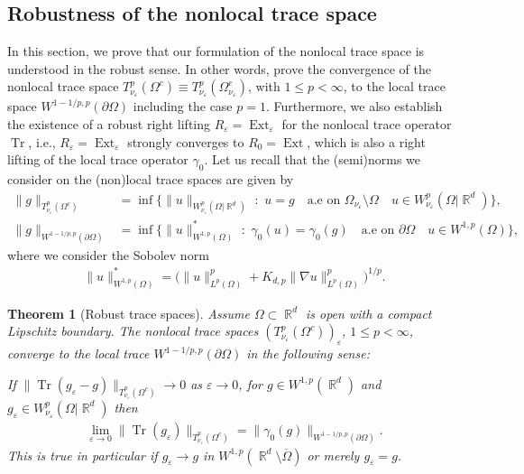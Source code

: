 \documentclass[12pt, reqno]{amsart}%
\theoremstyle{plain}  %
\newtheorem{theorem}{Theorem}[section]
\theoremstyle{definition}  %
\numberwithin{equation}{section}
\DeclareMathOperator{\R}{\mathbb{R}}
\newcommand{\eps}{\varepsilon}
\newcommand{\WnuOmRa}{W^p_{\nu_\eps}(\Omega|\R^d )}
\newcommand{\TnuOma}{T^p_{\nu_\eps} (\Omega^c)}
\begin{document}
\subsection{Robustness of the nonlocal trace space}
In this section, we prove that  our formulation of the nonlocal trace space is understood in the robust sense. In other words,  prove the convergence of the nonlocal trace space $\TnuOma\equiv T^p_{\nu_\eps}(\Omega^e_{\nu_\eps})$, with $1\leq p<\infty$, to the local  trace space  $W^{1-1/p ,p}(\partial \Omega) $ including the case $p=1$.
Furthermore, we also establish the existence of a robust right lifting  $R_\eps =\operatorname{Ext}_\eps$ for the nonlocal trace operator $\operatorname{Tr}$, i.e.,   $R_\eps= \operatorname{Ext}_\eps$ strongly converges to  $ R_0=\operatorname{Ext}$, which is also a right lifting of the local trace operator $\gamma_0$.   Let us recall that the (semi)norms we consider on the  (non)local trace spaces are given by
\begin{align*}
\|g\|_{T^p_{\nu_\eps}(\Omega^c)} &= \inf\big\{ \|u\|_{W^p_{\nu_\eps}(\Omega|\R^d)} \,\,:\,\, u= g\quad \text{a.e on $\Omega_{\nu_\eps}\setminus \Omega$}\quad u\in W^p_{\nu_\eps}(\Omega|\R^d)\big\},
\\
\|g\|_{W^{1-1/p ,p}(\partial \Omega)}
&= \inf\big\{ \|u\|^*_{W^{1,p}(\Omega)} \,\,:\,\, \gamma_0(u)= \gamma_0(g)\quad \text{a.e on $\partial \Omega$}\quad u\in W^{1,p}(\Omega)\big\},
\end{align*}
where we consider the Sobolev norm
\begin{align*}
\|u\|^*_{W^{1,p}(\Omega)} =\Big(\|u\|^p_{L^p(\Omega)}+ K_{d,p}\|\nabla u\|^p_{L^p(\Omega)}\Big)^{1/p}.
\end{align*}
\begin{theorem}[Robust trace spaces]
\label{thm:conv-trace}
Assume $\Omega\subset\R^d$ is open with a compact Lipschitz  boundary. The nonlocal trace spaces $(T^p_{\nu_\eps}(\Omega^c))_\eps$, $1\leq p<\infty$,  converge to the local trace $W^{1-1/p ,p}(\partial\Omega)$ in the  following sense:

\noindent If $\|\operatorname{Tr}(g_\eps-g)\|_{\TnuOma}\to 0$ as $\eps\to0$, for $g\in W^{1,p}(\R^d)$ and $g_\eps\in \WnuOmRa$ then
\begin{align*}
\lim_{\eps\to0}	\|\operatorname{Tr}(g_\eps)\|_{\TnuOma}=
\|\gamma_0(g)\|_{W^{1-1/p ,p}(\partial\Omega)}.
\end{align*}
This is true in particular if $g_\eps\to g$ in $W^{1,p}(\R^d\setminus \overline{\Omega})$ or merely  $g_\eps=g$.
\end{theorem}
\end{document}
